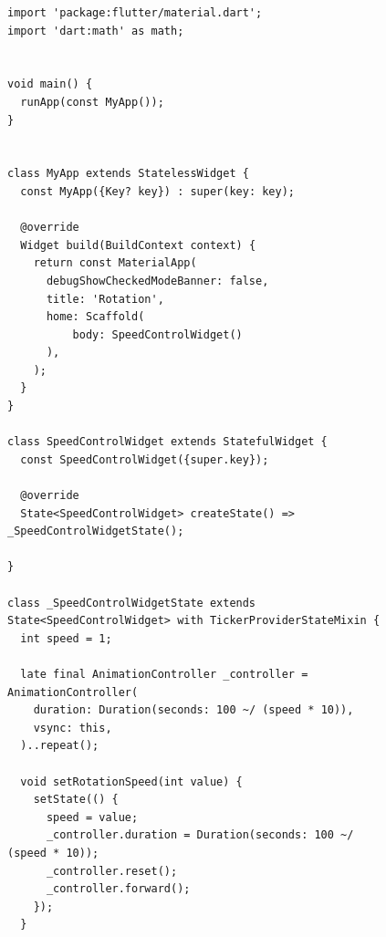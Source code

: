 \documentclass[a4paper, 14pt]{extarticle}
\begin{document}
\begin{figure}[H]
\begin{lstlisting}[language={},caption={Реализация мобильного приложения},label={lst:code1}]
import 'package:flutter/material.dart';
import 'dart:math' as math;


void main() {
  runApp(const MyApp());
}


class MyApp extends StatelessWidget {
  const MyApp({Key? key}) : super(key: key);

  @override
  Widget build(BuildContext context) {
    return const MaterialApp(
      debugShowCheckedModeBanner: false,
      title: 'Rotation',
      home: Scaffold(
          body: SpeedControlWidget()
      ),
    );
  }
}

class SpeedControlWidget extends StatefulWidget {
  const SpeedControlWidget({super.key});

  @override
  State<SpeedControlWidget> createState() => _SpeedControlWidgetState();

}

class _SpeedControlWidgetState extends State<SpeedControlWidget> with TickerProviderStateMixin {
  int speed = 1;

  late final AnimationController _controller = AnimationController(
    duration: Duration(seconds: 100 ~/ (speed * 10)), 
    vsync: this,
  )..repeat();

  void setRotationSpeed(int value) {
    setState(() {
      speed = value;
      _controller.duration = Duration(seconds: 100 ~/ (speed * 10));
      _controller.reset();
      _controller.forward();
    });
  }


\end{lstlisting}
\end{figure}
\end{document}
